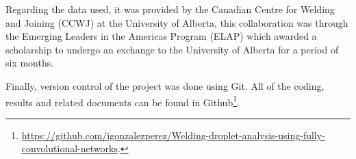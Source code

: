 Regarding the data used, it was provided by the Canadian Centre for Welding and Joining (CCWJ) at the University of Alberta, this collaboration was through the Emerging Leaders in the Americas Program (ELAP) which awarded a scholarship to undergo an exchange to the University of Alberta for a period of six months.

Finally, version control of the project was done using Git. All of the coding, results and related documents can be found in Github\footnote{\url{https://github.com/igonzalezperez/Welding-droplet-analysis-using-fully-convolutional-networks}.}.